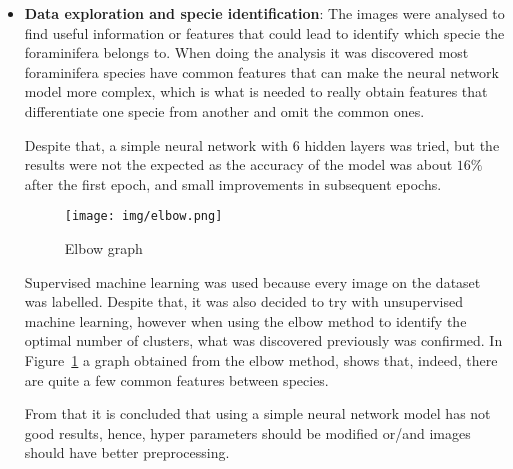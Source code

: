 \documentclass{article}
\begin{document}
\begin{itemize}
		\item \textbf{Data exploration and specie identification}: The images were analysed to find useful information or features that could lead to identify which specie the foraminifera belongs to. When doing the analysis it was discovered most foraminifera species have common features that can make the neural network model more complex, which is what is needed to really obtain features that differentiate one specie from another and omit the common ones.
		
		Despite that, a simple neural network with 6 hidden layers was tried, but the results were not the expected as the accuracy of the model was about $16\%$ after the first epoch, and small improvements in subsequent epochs.
		
		\begin{figure}
			\texttt{[image: img/elbow.png]}
			\caption{Elbow graph}
			\label{fig:elbow}
		\end{figure}
		
		Supervised machine learning was used because every image on the dataset was labelled. Despite that, it was also decided to try with unsupervised machine learning, however when using the elbow method to identify the optimal number of clusters,  what was discovered previously was confirmed. In Figure~\ref{fig:elbow} a graph obtained from the elbow method, shows that, indeed, there are quite a few common features between species.
		
		From that it is concluded that using a simple neural network model has not good results, hence, hyper parameters should be modified or/and images should have better preprocessing.
	\end{itemize}

	\printbibliography
\end{document}
